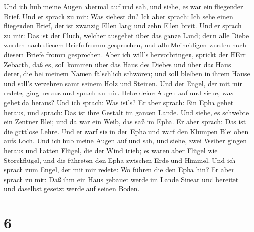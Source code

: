  Und ich hub meine Augen abermal auf und sah, und siehe, es
war ein fliegender Brief.  Und er sprach zu mir: Was siehest
du? Ich aber sprach: Ich sehe einen fliegenden Brief, der ist zwanzig
Ellen lang und zehn Ellen breit.  Und er sprach zu mir: Das
ist der Fluch, welcher ausgehet über das ganze Land; denn alle Diebe
werden nach diesem Briefe fromm gesprochen, und alle Meineidigen werden
nach diesem Briefe fromm gesprochen.  Aber ich will's
hervorbringen, spricht der HErr Zebaoth, daß es, soll kommen über das
Haus des Diebes und über das Haus derer, die bei meinem Namen fälschlich
schwören; und soll bleiben in ihrem Hause und soll's verzehren samt
seinem Holz und Steinen.  Und der Engel, der mit mir redete,
ging heraus und sprach zu mir: Hebe deine Augen auf und siehe, was gehet
da heraus?  Und ich sprach: Was ist's? Er aber sprach: Ein
Epha gehet heraus, und sprach: Das ist ihre Gestalt im ganzen Lande.
 Und siehe, es schwebte ein Zentner Blei; und da war ein
Weib, das saß im Epha.  Er aber sprach: Das ist die gottlose
Lehre. Und er warf sie in den Epha und warf den Klumpen Blei oben aufs
Loch.  Und ich hub meine Augen auf und sah, und siehe, zwei
Weiber gingen heraus und hatten Flügel, die der Wind trieb; es waren
aber Flügel wie Storchflügel, und die führeten den Epha zwischen Erde
und Himmel.  Und ich sprach zum Engel, der mit mir redete:
Wo führen die den Epha hin?  Er aber sprach zu mir: Daß ihm
ein Haus gebauet werde im Lande Sinear und bereitet und daselbst gesetzt
werde auf seinen Boden.

\hypertarget{section-5}{%
\section{6}\label{section-5}}

